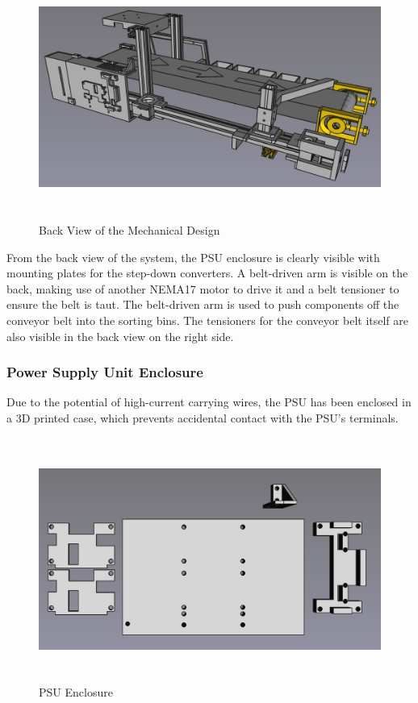 \begin{figure}[H]
    \begin{minipage}[h]{0.95\textwidth}
        \centering
        \includegraphics[height=8cm]{imgs/freecad/wholeback.jpg}
        \caption{Back View of the Mechanical Design}
    \end{minipage}
\end{figure}

From the back view of the system, the PSU enclosure is clearly visible with mounting plates for the step-down converters. A belt-driven arm is visible on the back, making use of another NEMA17 motor to drive it and a belt tensioner to ensure the belt is taut. The belt-driven arm is used to push components off the conveyor belt into the sorting bins. The tensioners for the conveyor belt itself are also visible in the back view on the right side.

\subsubsection{Power Supply Unit Enclosure}
\label{sec:power-supply-unit-enclosure}

Due to the potential of high-current carrying wires, the PSU has been enclosed in a 3D printed case, which prevents accidental contact with the PSU's terminals.

\begin{figure}[H]
    \begin{minipage}[h]{0.95\textwidth}
        \centering
        \includegraphics[height=8cm]{imgs/freecad/psu_mount.jpg}
        \caption{PSU Enclosure}
    \end{minipage}
\end{figure}

